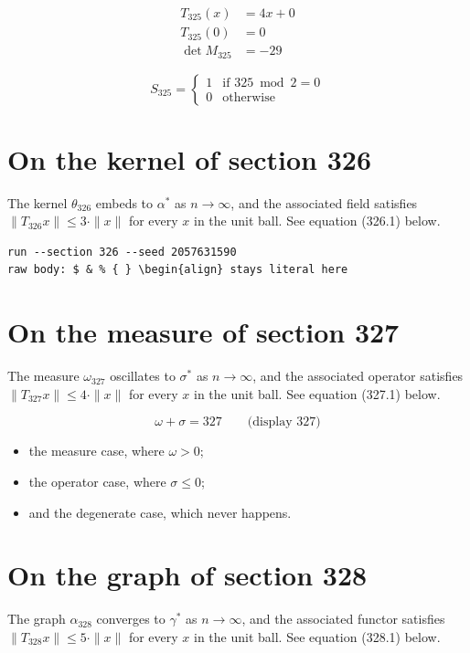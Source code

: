 \documentclass{article}
\begin{document}
\begin{align}
T_{325}(x) &= 4 x + 0 \\
T_{325}(0) &= 0 \\
\det M_{325} &= -29
\end{align}

\begin{equation}
S_{325} = \begin{cases} 1 & \text{if } 325 \bmod 2 = 0 \\ 0 & \text{otherwise} \end{cases}
\end{equation}

\section{On the kernel of section 326}
The kernel $\theta_{326}$ embeds to $\alpha^{*}$ as $n \to \infty$,
and the associated field satisfies $\|T_{326} x\| \leq 3 \cdot \|x\|$
for every $x$ in the unit ball. See equation (326.1) below.

\begin{verbatim}
run --section 326 --seed 2057631590
raw body: $ & % { } \begin{align} stays literal here
\end{verbatim}

\section{On the measure of section 327}
The measure $\omega_{327}$ oscillates to $\sigma^{*}$ as $n \to \infty$,
and the associated operator satisfies $\|T_{327} x\| \leq 4 \cdot \|x\|$
for every $x$ in the unit ball. See equation (327.1) below.

$$
\omega + \sigma = 327 \qquad \text{(display 327)}
$$

\begin{itemize}
  \item the measure case, where $\omega > 0$;
  \item the operator case, where $\sigma \leq 0$;
  \item and the degenerate case, which never happens.
\end{itemize}

\section{On the graph of section 328}
The graph $\alpha_{328}$ converges to $\gamma^{*}$ as $n \to \infty$,
and the associated functor satisfies $\|T_{328} x\| \leq 5 \cdot \|x\|$
for every $x$ in the unit ball. See equation (328.1) below.
\end{document}
